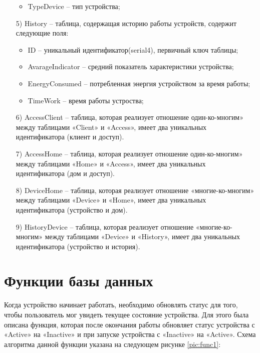 \begin{enumerate}
\begin{itemize}
        \item TypeDevice -- тип устройства;
    \end{itemize}
    \item[5)] History -- таблица, содержащая историю работы устройств, содержит следующие поля:
    \begin{itemize}
        \item ID -- уникальный идентификатор(serial4), первичный ключ таблицы;
        \item AvarageIndicator -- средний показатель характеристики устройства;
        \item EnergyConsumed -- потребленная энергия устройством за время работы;
        \item TimeWork -- время работы устроства;
    \end{itemize}
    \item[6)] AccessClient -- таблица, которая реализует отношение 
    один-ко-многим» между таблицами «Client» и «Access», 
    имеет два уникальных идентификатора (клиент и доступ).
    \item[7)] AccessHome -- таблица, которая реализует отношение 
    один-ко-многим» между таблицами «Home» и «Access»,
    имеет два уникальных идентификатора (дом и доступ).
    \item[8)] DeviceHome -- таблица, которая реализует отношение 
    «многие-ко-многим» между таблицами «Device» и «Home»,
    имеет два уникальных идентификатора (устройство и дом).
    \item[9)] HistoryDevice -- таблица, которая реализует отношение 
    «многие-ко-многим» между таблицами «Device» и «History»,
    имеет два уникальных идентификатора (устройство и история).
\end{enumerate}

\section{Функции базы данных}

Когда устройство начинает работать, необходимо обновлять 
статус для того, чтобы пользователь
мог увидеть текущее состояние устройства. 
Для этого была описана функция, которая после окончания работы
обновляет статус устройства с «Active» на «Inactive» и 
при запуске устройства с «Inactive» на «Active». 
Схема алгоритма данной функции указана на следующем рисунке
\ref{pic:func1}:

